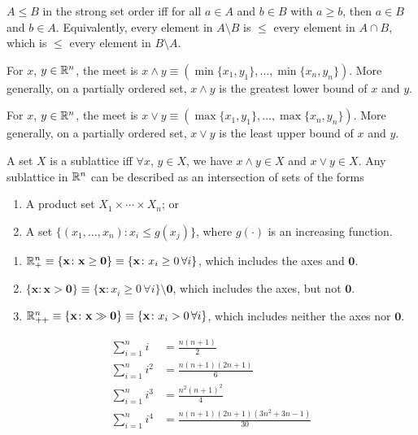 \documentclass[8pt,letterpaper, landscape]{extarticle} %
\newcommand{\mx}{\ensuremath{\mathbf{x}}}
\newcommand{\mzero}{\ensuremath{\mathbf{0}}}
\begin{document}
\begin{multicols}{3}
\begin{description}
 $ A \leq B $ in the strong set order iff for all $ a \in A $ and $ b \in B $ with $ a \geq b $, then $ a \in B $ and $ b \in A $. Equivalently, every element in $ A \setminus B $ is $ \leq $ every element in $ A \cap B $, which is $ \leq $ every element in $ B \setminus A $.

 For $ x $, $ y \in \mathbb{R}^n $, the meet is $ x \wedge y \equiv (\min \{ x_1, y_1 \}, \dotsc , \min \{ x_n, y_n \}) $. More generally, on a partially ordered set, $ x \wedge y $ is the greatest lower bound of $ x $ and $ y $.

 For $ x $, $ y \in \mathbb{R}^n $, the meet is $ x \vee y \equiv (\max \{ x_1, y_1 \}, \dotsc , \max \{ x_n, y_n \}) $. More generally, on a partially ordered set, $ x \vee y $ is the least upper bound of $ x $ and $ y $.

 A set $ X $ is a sublattice iff $ \forall x $, $ y \in X $, we have $ x \wedge y \in X $ and $ x \vee y \in X $. Any sublattice in $ \mathbb{R}^n $ can be described as an intersection of sets of the forms
\begin{enumerate}
\item A product set $ X_1 \times \dotsb \times X_n $; or
\item A set $ \{ (x_1 , \dotsc , x_n) \colon x_i \leq g(x_j) \} $, where $ g(\cdot) $ is an increasing function.
\end{enumerate}

\begin{enumerate}
\item $ \R^n_+ \equiv \{ \mx \colon \mx \geq \mzero \} \equiv \{ \mx \colon x_i \geq 0 \, \forall i \} $, which includes the axes and $ \mzero $.
\item $ \{ \mx \colon \mx > \mzero \} \equiv \{ \mx \colon x_i \geq 0 \, \forall i \} \setminus \mzero $, which includes the axes, but not $ \mzero $.
\item $ \R^n_{++} \equiv \{ \mx \colon \mx \gg \mzero \} \equiv \{ \mx \colon x_i > 0 \, \forall i \} $, which includes neither the axes nor $ \mzero $.
\end{enumerate}

\begin{align*}
\sum_{i=1}^{n} i &= \frac{n (n+1)}{2} \\
\sum_{i=1}^{n} i^2 &= \frac{n (n+1) (2n + 1)}{6} \\
\sum_{i=1}^{n} i^3 &= \frac{n^2 (n+1)^2}{4} \\
\sum_{i=1}^{n} i^4 &= \frac{n (n+1) (2n + 1) (3n^2 + 3n - 1)}{30}
\end{align*}


\end{description}
\end{multicols}
\end{document}
